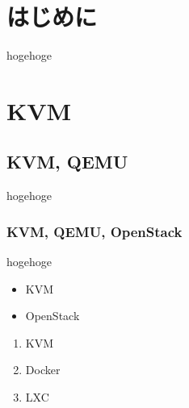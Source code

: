 \documentclass[9pt,b5paper,tombo]{jsbook}
\begin{document}
\enlargethispage{\paperwidth}
\thispagestyle{empty}
\vspace*{-1truein}
\vspace*{-\topmargin}
\vspace*{-\headheight}
\vspace*{-\headsep}
\vspace*{-\topskip}
\noindent\hspace*{-1in}\hspace*{-\oddsidemargin}

\newpage

\thispagestyle{empty}

\tableofcontents

\newpage

\thispagestyle{empty}


\chapter{はじめに}

\setcounter{page}{1}

hogehoge

\chapter{KVM}

\section{KVM, QEMU}

hogehoge

\subsection{KVM, QEMU, OpenStack}

hogehoge

\begin{itemize}
  \item KVM
  \item OpenStack
\end{itemize}


\begin{enumerate}
  \item KVM
  \item Docker
  \item LXC
\end{enumerate}
\end{document}
